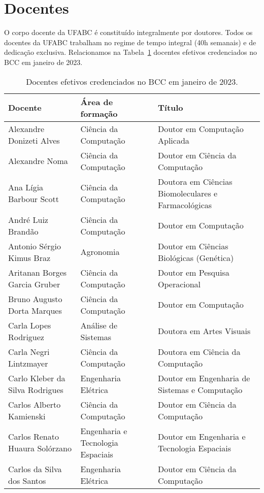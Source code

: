 \section{Docentes}
\label{sec:docentes}

O corpo docente da UFABC é constituído integralmente por doutores.
Todos os docentes da UFABC trabalham no regime de tempo integral (40h semanais)
e de dedicação exclusiva.
Relacionamos na Tabela~\ref{tab:docentes} docentes efetivos credenciados no BCC em janeiro de
2023.

{\small
\begin{longtable}{|p{}|p{}|p{}|}
    \caption{Docentes efetivos credenciados no BCC em janeiro de 2023.}
    \label{tab:docentes}
    \endfirsthead
    \endhead

    \hline
    \textbf{Docente} & \textbf{Área de formação} & \textbf{Título} \\
    \hline\hline
    Alexandre Donizeti Alves & Ciência da Computação & Doutor em Computação Aplicada \\
    Alexandre Noma & Ciência da Computação & Doutor em Ciência da Computação \\
    Ana Lígia Barbour Scott & Ciência da Computação & Doutora em Ciências Biomoleculares e Farmacológicas \\
    André Luiz Brandão & Ciência da Computação & Doutor em Computação \\
    Antonio Sérgio Kimus Braz & Agronomia & Doutor em Ciências Biológicas (Genética) \\
    Aritanan Borges Garcia Gruber & Ciência da Computação & Doutor em Pesquisa Operacional \\
    Bruno Augusto Dorta Marques & Ciência da Computação & Doutor em Computação \\
    Carla Lopes Rodriguez & Análise de Sistemas & Doutora em Artes Visuais \\
    Carla Negri Lintzmayer & Ciência da Computação & Doutora em Ciência da Computação \\
    Carlo Kleber da Silva Rodrigues & Engenharia Elétrica & Doutor em Engenharia de Sistemas e Computação \\
    Carlos Alberto Kamienski & Ciência da Computação & Doutor em Ciência da Computação \\
    Carlos Renato Huaura Solórzano & Engenharia e Tecnologia Espaciais & Doutor em Engenharia e Tecnologia Espaciais \\
    Carlos da Silva dos Santos & Engenharia Elétrica & Doutor em Ciência da Computação \\

\end{longtable}}
